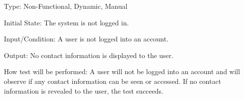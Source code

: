 \documentclass[12pt, titlepage]{article}
\begin{document}
\begin{enumerate}
  Type: Non-Functional, Dynamic, Manual

  Initial State: The system is not logged in.

  Input/Condition: A user is not logged into an account.

  Output: No contact information is displayed to the user.

  How test will be performed: A user will not be logged into an account and will
  observe if any contact information can be seen or accessed. If no contact information
  is revealed to the user, the test succeeds.







\end{enumerate}








\end{document}

